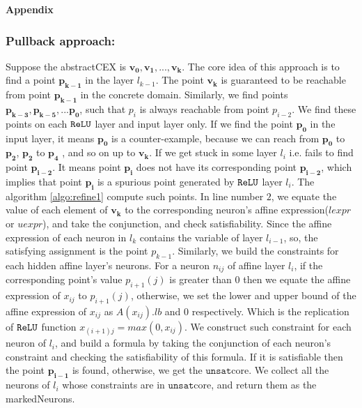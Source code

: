 \onecolumn

\begin{center}
    \Large{\bf{Appendix}}    
\end{center}


\subsubsection{Pullback approach: }

Suppose the abstractCEX is $\boldsymbol{v_0}, \boldsymbol{v_1}, ... , \boldsymbol{v_k}$. 
The core idea of this approach is to find a point $\boldsymbol{p_{k-1}}$ in the layer $l_{k-1}$. 
The point $\boldsymbol{v_k}$ is guaranteed to be reachable from point $\boldsymbol{p_{k-1}}$ in the concrete domain.
Similarly, we find points $\boldsymbol{p_{k-3}}, \boldsymbol{p_{k-5}}, ... \boldsymbol{p_0}$, 
such that $p_i$ is always reachable from point $p_{i-2}$. 
We find these points on each $\mathtt{ReLU}${} layer and input layer only. 
If we find the point $\boldsymbol{p_0}$ in the input layer, it means $\boldsymbol{p_0}$ is a counter-example, 
because we can reach from $\boldsymbol{p_0}$ to $\boldsymbol{p_2}$, $\boldsymbol{p_2}$ to $\boldsymbol{p_4}$ 
, and so on up to $\boldsymbol{v_k}$. 
If we get stuck in some layer $l_i$ i.e. fails to find point 
$\boldsymbol{p_{i-2}}$. It means point $\boldsymbol{p_i}$ does not have its corresponding point $\boldsymbol{p_{i-2}}$, 
which implies that point $\boldsymbol{p_i}$ is a spurious point generated by $\mathtt{ReLU}${} layer $l_i$. 
The algorithm \ref{algo:refine1} compute such points. In line number $2$, we equate the value of 
each element of $\boldsymbol{v_k}$ to the corresponding neuron's affine expression($lexpr$ or $uexpr$), 
and take the conjunction, and check satisfiability. Since the affine expression of each neuron in $l_k$ contains the 
variable of layer $l_{i-1}$, so, the satisfying assignment is the point $p_{k-1}$. Similarly, we build the constraints
for each hidden affine layer's neurons. For a neuron $n_{ij}$ of affine layer $l_i$, 
if the corresponding point's value $p_{i+1}(j)$ is greater than $0$ then we equate the affine expression of $x_{ij}$ to $p_{i+1}(j)$,
otherwise, we set the lower and upper bound of the affine expression of $x_{ij}$ as $A(x_{ij}).lb$ and $0$ respectively. 
Which is the replication of $\mathtt{ReLU}${} function $x_{(i+1)j} = max(0, x_{ij})$. We construct such constraint 
for each neuron of $l_i$, and build a formula by taking the conjunction
of each neuron’s constraint and checking the satisfiability of this formula.
If it is satisfiable then the point $\boldsymbol{p_{i-1}}$ is found, 
otherwise, we get the $\mathtt{unsat}$core. We collect all the neurons of $l_i$ whose constraints are 
in $\mathtt{unsat}$core, and return them as the markedNeurons.   



